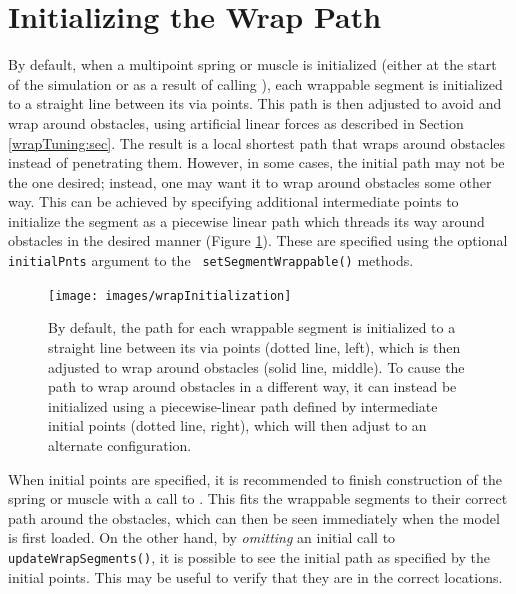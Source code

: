 \section{Initializing the Wrap Path}
\label{wrappingInit:sec}

By default, when a multipoint spring or muscle is initialized (either
at the start of the simulation or as a result of calling
), each
wrappable segment is initialized to a straight line between its via
points. This path is then adjusted to avoid and wrap around obstacles,
using artificial linear forces as described in Section
\ref{wrapTuning:sec}. The result is a local shortest path that wraps
around obstacles instead of penetrating them.  However, in some cases,
the initial path may not be the one desired; instead, one may want it
to wrap around obstacles some other way. This can be achieved by
specifying additional intermediate points to initialize the segment as
a piecewise linear path which threads its way around obstacles in the
desired manner (Figure \ref{wrapInitialization:fig}).  These are
specified using the optional {\tt initialPnts} argument to the {\tt
setSegmentWrappable()} methods.

\begin{figure}[ht]
\begin{center}
 \texttt{[image: images/wrapInitialization]}
\end{center}
\caption{By default, the path for each wrappable segment is
initialized to a straight line between its via points (dotted line,
left), which is then adjusted to wrap around obstacles (solid line,
middle). To cause the path to wrap around obstacles in a different
way, it can instead be initialized using a piecewise-linear
path defined by intermediate initial points (dotted line, right),
which will then adjust to an alternate configuration.}
\label{wrapInitialization:fig}
\end{figure}

\begin{sideblock}
When initial points are specified, it is recommended to finish
construction of the spring or muscle with a call to
.  This fits
the wrappable segments to their correct path around the obstacles,
which can then be seen immediately when the model is first loaded. On
the other hand, by {\it omitting} an initial call to {\tt
updateWrapSegments()}, it is possible to see the initial path as
specified by the initial points. This may be useful to
verify that they are in the correct locations.
\end{sideblock}

